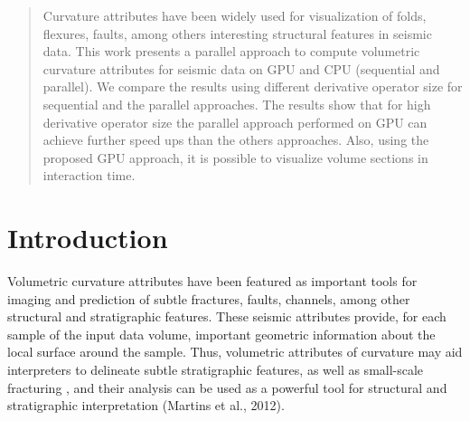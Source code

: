 \documentclass[conference]{IEEEtran}
\begin{document}
% 








\maketitle


\begin{abstract}
Curvature attributes have been widely used for visualization of folds, flexures, faults, among others interesting structural features in seismic data. This work presents a parallel approach to compute volumetric curvature attributes for seismic data on GPU and CPU (sequential and parallel). We compare the results using different derivative operator size for  sequential and the parallel approaches. The results show that for high derivative operator size the parallel approach performed on GPU can achieve further speed ups than the others approaches. Also, using the proposed GPU approach, it is possible to visualize volume sections in interaction time.
\end{abstract}

\IEEEpeerreviewmaketitle



\section{Introduction}
Volumetric curvature attributes have been featured as important tools for imaging and prediction of subtle fractures, faults, channels, among other structural and stratigraphic features. These seismic attributes provide, for each sample of the input data volume, important geometric information about the local surface around the sample. Thus, volumetric attributes of curvature may aid interpreters to delineate subtle stratigraphic features, as well as small-scale fracturing , and their analysis can be used as a powerful tool for structural and stratigraphic interpretation (Martins et al., 2012).
\end{document}
